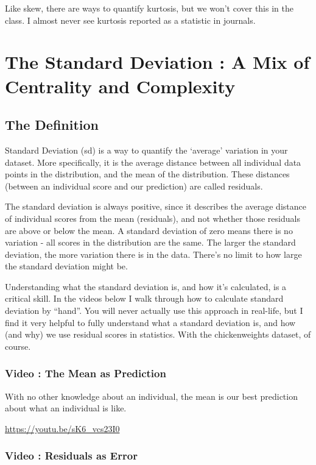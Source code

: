 \documentclass[
  letterpaper,
  DIV=11,
  numbers=noendperiod,
  oneside]{scrreprt}
\begin{document}
Like skew, there are ways to quantify kurtosis, but we won't cover this
in the class. I almost never see kurtosis reported as a statistic in
journals.

\section{The Standard Deviation : A Mix of Centrality and
Complexity}\label{the-standard-deviation-a-mix-of-centrality-and-complexity}

\subsection{The Definition}\label{the-definition-3}

Standard Deviation (sd) is a way to quantify the `average' variation in
your dataset. More specifically, it is the average distance between all
individual data points in the distribution, and the mean of the
distribution. These distances (between an individual score and our
prediction) are called residuals.

The standard deviation is always positive, since it describes the
average distance of individual scores from the mean (residuals), and not
whether those residuals are above or below the mean. A standard
deviation of zero means there is no variation - all scores in the
distribution are the same. The larger the standard deviation, the more
variation there is in the data. There's no limit to how large the
standard deviation might be.

Understanding what the standard deviation is, and how it's calculated,
is a critical skill. In the videos below I walk through how to calculate
standard deviation by ``hand''. You will never actually use this
approach in real-life, but I find it very helpful to fully understand
what a standard deviation is, and how (and why) we use residual scores
in statistics. With the chickenweights dataset, of course.

\subsubsection{Video : The Mean as
Prediction}\label{video-the-mean-as-prediction}

With no other knowledge about an individual, the mean is our best
prediction about what an individual is like.

\url{https://youtu.be/sK6_vcs23I0}

\subsubsection{Video : Residuals as
Error}\label{video-residuals-as-error}
\end{document}
